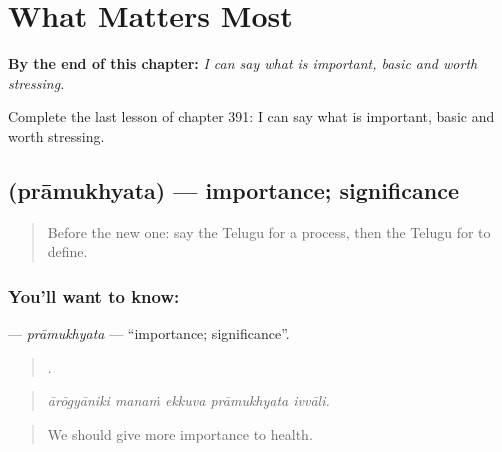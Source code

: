 
\chapter{What Matters Most}
\label{ch:te-what-matters-most}

\begin{chapteropening}
\textbf{By the end of this chapter:} \emph{I can say what is important, basic and worth stressing.}

Complete the last lesson of chapter 391: I can say what is important, basic and worth stressing.
\end{chapteropening}

\section[\texorpdfstring{\te{ప్రాముఖ్యత} (prāmukhyata)}{ప్రాముఖ్యత (prāmukhyata)}]{ (prāmukhyata) — importance; significance}

\label{lesson:TE-C391-pramukhyata}



\begin{quote}
Before the new one: say the Telugu for a process, then the Telugu for to define.
\end{quote}

\subsection*{You'll want to know: }
\textbf{} — \emph{prāmukhyata} — \textquotedblleft{}importance; significance\textquotedblright{}.

\begin{quote}
    .
\end{quote}

\begin{quote}
\emph{ārōgyāniki manaṁ ekkuva prāmukhyata ivvāli.}
\end{quote}

\begin{quote}
We should give more importance to health.
\end{quote}

